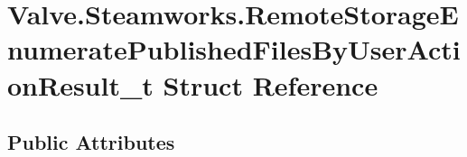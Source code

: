 \hypertarget{structValve_1_1Steamworks_1_1RemoteStorageEnumeratePublishedFilesByUserActionResult__t}{}\section{Valve.\+Steamworks.\+Remote\+Storage\+Enumerate\+Published\+Files\+By\+User\+Action\+Result\+\_\+t Struct Reference}
\label{structValve_1_1Steamworks_1_1RemoteStorageEnumeratePublishedFilesByUserActionResult__t}
\subsection*{Public Attributes}
